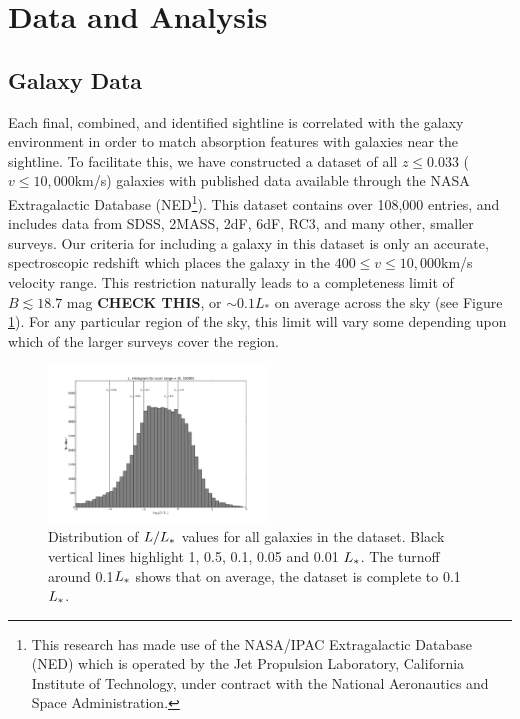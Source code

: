 \documentclass[iop]{emulateapj-rtx4}
\begin{document}


\section{Data and Analysis}

\subsection{Galaxy Data}
Each final, combined, and identified sightline is correlated with the galaxy environment in order to match absorption features with galaxies near the sightline. To facilitate this, we have constructed a dataset of all $z\leq 0.033$ ($v\leq 10,000$km/s) galaxies with published data available through the NASA Extragalactic Database (NED\footnote{This research has made use of the NASA/IPAC Extragalactic Database (NED) which is operated by the Jet Propulsion Laboratory, California Institute of Technology, under contract with the National Aeronautics and Space Administration.}). This dataset contains over 108,000 entries, and includes data from SDSS, 2MASS, 2dF, 6dF, RC3, and many other, smaller surveys. Our criteria for including a galaxy in this dataset is only an accurate, spectroscopic redshift which places the galaxy in the $400 \leq v \leq 10,000$km/s velocity range. This restriction naturally leads to a completeness limit of $B \lesssim 18.7$ mag \textbf{CHECK THIS}, or $\sim0.1 L_*$ on average across the sky (see Figure \ref{completeness}). For any particular region of the sky, this limit will vary some depending upon which of the larger surveys cover the region. 

\begin{figure}[ht!]
        \centering
        \vspace{-10pt}
        \includegraphics[width=0.52\textwidth]{completeness_hist.pdf}
        \caption{\small{Distribution of $L/L_{\**}$ values for all galaxies in the dataset. Black vertical lines highlight 1, 0.5, 0.1, 0.05 and 0.01 $L_{\**}$. The turnoff around 0.1$L_{\**}$ shows that on average, the dataset is complete to 0.1$L_{\**}$.}}
        \label{completeness}
\end{figure} 
\end{document}
